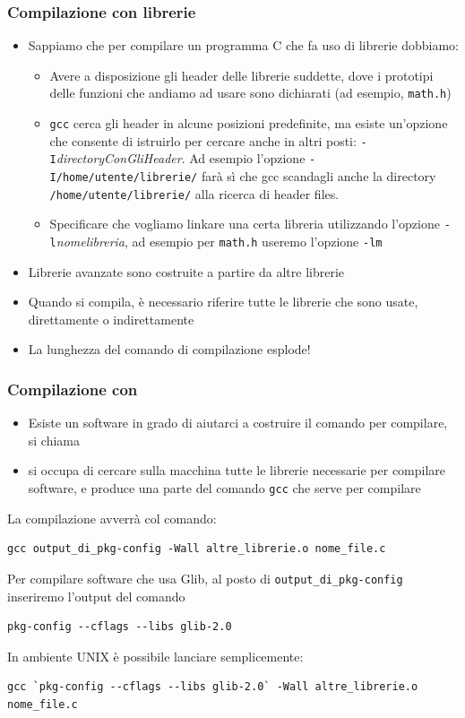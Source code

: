 \documentclass{beamer}
\begin{document}
\begin{frame}[fragile]
\frametitle{Compilazione con librerie}
\begin{itemize}
 \item Sappiamo che per compilare un programma C che fa uso di librerie dobbiamo:
  \begin{itemize}
    \item Avere a disposizione gli header delle librerie suddette, dove i prototipi delle funzioni che andiamo ad usare sono dichiarati (ad esempio, \texttt{math.h})
    \item \texttt{gcc} cerca gli header in alcune posizioni predefinite, ma esiste un'opzione che consente di istruirlo per cercare anche in altri posti: \texttt{-I}\textit{directoryConGliHeader}. Ad esempio l'opzione \texttt{-I/home/utente/librerie/} farà sì che gcc scandagli anche la directory \texttt{/home/utente/librerie/} alla ricerca di header files.
    \item Specificare che vogliamo linkare una certa libreria utilizzando l'opzione \texttt{-l}\textit{nomelibreria}, ad esempio per \texttt{math.h} useremo l'opzione \texttt{-lm}
  \end{itemize}
 \item Librerie avanzate sono costruite a partire da altre librerie
 \item Quando si compila, è necessario riferire tutte le librerie che sono usate, direttamente o indirettamente
 \item La lunghezza del comando di compilazione esplode!
 \end{itemize}
\end{frame}

\begin{frame}[fragile]
\frametitle{Compilazione con \pkgconfig{}}
\begin{itemize}
 \item Esiste un software in grado di aiutarci a costruire il comando per compilare, si chiama \pkgconfig{}
 \item \pkgconfig{} si occupa di cercare sulla macchina tutte le librerie necessarie per compilare software, e produce una parte del comando \texttt{gcc} che serve per compilare
\end{itemize}
La compilazione avverrà col comando:
\scriptsize
\begin{verbatim}
gcc output_di_pkg-config -Wall altre_librerie.o nome_file.c
\end{verbatim}
Per compilare software che usa Glib, al posto di \texttt{output\_di\_pkg-config} inseriremo l'output del comando
\scriptsize
\begin{verbatim}
pkg-config --cflags --libs glib-2.0
\end{verbatim}
In ambiente UNIX è possibile lanciare semplicemente:
\scriptsize
\begin{verbatim}
gcc `pkg-config --cflags --libs glib-2.0` -Wall altre_librerie.o nome_file.c
\end{verbatim}
\end{frame}
\end{document}
